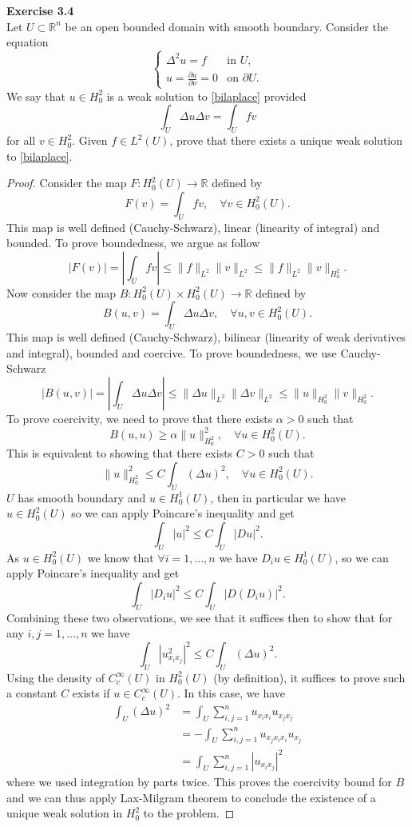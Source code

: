 \documentclass{article}
\newcommand{\R}{\mathbb{R}}
\begin{document}
\textbf{Exercise 3.4}\\
Let $U\subset\R^n$ be an open bounded domain with smooth boundary. Consider the equation
\begin{equation}\label{bilaplace}
\begin{cases}
    \Delta^2u=f &\text{in }U,\\
    u=\frac{\partial u}{\partial\nu}=0&\text{on }\partial U.
\end{cases}
\end{equation}
We say that $u\in H_0^2$ is a weak solution to \eqref{bilaplace} provided
\[
\int_U\Delta u\Delta v=\int_Ufv
\]
for all $v\in H_0^2$. Given $f\in L^2(U)$, prove that there exists a unique weak solution to \eqref{bilaplace}.
\begin{proof}
    Consider the map $F:H_0^2(U)\to\R$ defined by
    \[
    F(v)=\int_Ufv,\quad\forall v\in H_0^2(U).
    \]
    This map is well defined (Cauchy-Schwarz), linear (linearity of integral) and bounded. To prove boundedness, we argue as follow
    \[
    |F(v)|=\left|\int_Ufv\right|\leq \lVert f\rVert_{L^2}\lVert v\rVert_{L^2}\leq \lVert f\rVert_{L^2}\lVert v\rVert_{H^2_0}.
    \]
    Now consider the map $B:H_0^2(U)\times H_0^2(U)\to\R$ defined by
    \[
    B(u,v)=\int_U\Delta u\Delta v,\quad\forall u,v\in H_0^2(U).
    \]
    This map is well defined (Cauchy-Schwarz), bilinear (linearity of weak derivatives and integral), bounded and coercive. To prove boundedness, we use Cauchy-Schwarz
    \[
    |B(u,v)|=\left|\int_U\Delta u\Delta v\right|\leq\lVert\Delta u\rVert_{L^2}\lVert\Delta v\rVert_{L^2}\leq \lVert u\rVert_{H^2_0}\lVert v\rVert_{H_0^2}.
    \]
    To prove coercivity, we need to prove that there exists $\alpha>0$ such that 
    \[
    B(u,u)\geq\alpha\lVert u\rVert_{H_0^2}^2,\quad\forall u\in H_0^2(U).
    \]
    This is equivalent to showing that there exists $C>0$ such that 
    \[
    \lVert u\rVert_{H_0^2}^2\leq C\int_{U}(\Delta u)^2,\quad\forall u\in H_0^2(U).
    \]
    $U$ has smooth boundary and $u\in H_0^1(U)$, then in particular we have $u\in H_0^2(U)$ so we can apply Poincare's inequality and get
    \[
    \int_U|u|^2\leq C\int_U|Du|^2.
    \]
    As $u\in H_0^2(U)$ we know that $\forall i=1,\dots,n$ we have $D_iu\in H_0^1(U)$, so we can apply Poincare's inequality and get
    \[
    \int_U|D_iu|^2\leq C\int_U|D(D_iu)|^2.
    \]
    Combining these two observations, we see that it suffices then to show that for any $i,j=1,\dots,n$ we have
    \[
    \int_U|u_{x_ix_j}^2|^2\leq C\int_U(\Delta u)^2.
    \]
    Using the density of $C_c^\infty(U)$ in $H_0^2(U)$ (by definition), it suffices to prove such a constant $C$ exists if $u\in C_c^\infty(U)$. In this case, we have
    \[
    \begin{aligned}
        \int_U(\Delta u)^2&=\int_U\sum_{i,j=1}^nu_{x_ix_i}u_{x_jx_j}\\
        &=-\int_U\sum_{i,j=1}^nu_{x_jx_ix_i}u_{x_j}\\
        &=\int_U\sum_{i,j=1}^n|u_{x_ix_j}|^2
    \end{aligned}
    \]
    where we used integration by parts twice. This proves the coercivity bound for $B$ and we can thus apply Lax-Milgram theorem to conclude the existence of a unique weak solution in $H_0^2$ to the problem.
\end{proof}
\end{document}
